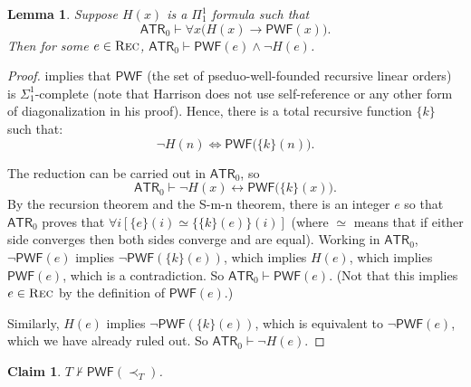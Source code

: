 \documentclass{amsart}
\newtheorem{lemma}[theorem]{Lemma}
\newtheorem*{claim}{Claim}
\theoremstyle{definition}
\theoremstyle{remark}
\begin{document}
\begin{lemma}\label{Rathjen}
    Suppose $H(x)$ is a $\Pi^1_1$ formula such that 
    $$\mathsf{ATR}_0 \vdash \forall x \big(H(x)\to \mathsf{PWF}(x)\big).$$ Then for some $e\in\textsc{Rec}$, $\mathsf{ATR}_0\vdash \mathsf{PWF}(e) \wedge \neg H(e)$.
\end{lemma}
\begin{proof}
    \cite[Theorem 1.3]{harrison1968recursive} implies that $\mathsf{PWF}$ (the set of pseduo-well-founded recursive linear orders) is $\Sigma^1_1$-complete (note that Harrison does not use self-reference or any other form of diagonalization in his proof). Hence, there is a total recursive function $\{k\}$ such that:
    $$\neg H(n) \Longleftrightarrow \mathsf{PWF}\big(\{{k}\}(n)\big).$$

    The reduction can be carried out in $\mathsf{ATR}_0$, so
    $$\mathsf{ATR}_0 \vdash \neg H(x) \leftrightarrow \mathsf{PWF}\big(\{{k}\}(x)\big).$$
    By the recursion theorem and the S-m-n theorem, there is an integer $e$ so that $\mathsf{ATR}_0$ proves that $\forall i[\{e\}(i)\simeq \{\{k\}(e)\}(i)]$ (where $\simeq$ means that if either side converges then both sides converge and are equal). Working in $\mathsf{ATR}_0$, $\neg \mathsf{PWF}(e)$ implies $\neg\mathsf{PWF}(\{k\}(e))$, which implies $H(e)$, which implies $\mathsf{PWF}(e)$, which is a contradiction. So $\mathsf{ATR}_0\vdash \mathsf{PWF}(e)$. (Not that this implies $e\in\textsc{Rec}$ by the definition of $\mathsf{PWF}(e)$.)

    Similarly, $H(e)$ implies $\neg \mathsf{PWF}(\{k\}(e))$, which is equivalent to $\neg\mathsf{PWF}(e)$, which we have already ruled out. So $\mathsf{ATR}_0\vdash \neg H(e)$.
\end{proof}


\begin{claim}
    $T\nvdash \mathsf{PWF}(\prec_T)$.
\end{claim}
\end{document}
